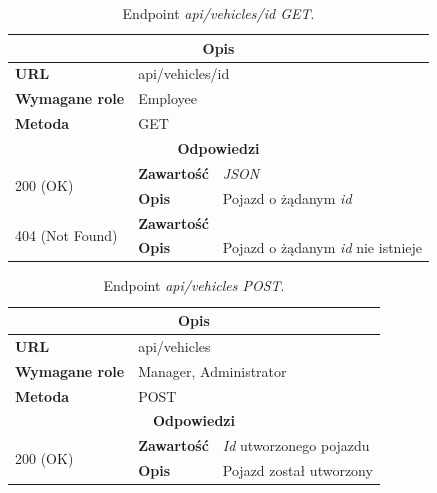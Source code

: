 \documentclass[eng,printmode,openany]{mgr}
\begin{document}
\begin{table}[H]
	\caption{Endpoint \textit{api/vehicles/id GET}.}
	\begin{tabularx}{\textwidth}{|l|l|X|}
		\hline
		\multicolumn{3}{|c|}{\textbf{\textbf{Opis}}}
		\\ \hline
		\textbf{URL}                         & \multicolumn{2}{l|}{api/vehicles/id}
		\\ \hline
		\textbf{Wymagane role}               & \multicolumn{2}{l|}{Employee}
		\\ \hline
		\textbf{Metoda}                      & \multicolumn{2}{l|}{GET}
		\\ \hline
		\multicolumn{3}{|c|}{\textbf{Odpowiedzi}}
		\\ \hline
		\multirow{2}{*}{200 (OK)} 	        & \textbf{Zawartość}   	& \textit{JSON}
		\\ \cline{2-3}                      & \textbf{Opis}         	& Pojazd o żądanym \textit{id}
		\\ \hline
		\multirow{2}{*}{404 (Not Found)} 	& \textbf{Zawartość}     & 
		\\ \cline{2-3}                      & \textbf{Opis}          & Pojazd o żądanym \textit{id} nie istnieje
		\\ \hline
	\end{tabularx}
\end{table}

\begin{table}[H]
	\caption{Endpoint \textit{api/vehicles POST}.}
	\begin{tabularx}{\textwidth}{|l|l|X|}
		\hline
		\multicolumn{3}{|c|}{\textbf{\textbf{Opis}}}
		\\ \hline
		\textbf{URL}                       & \multicolumn{2}{l|}{api/vehicles}
		\\ \hline
		\textbf{Wymagane role}             & \multicolumn{2}{l|}{Manager, Administrator}
		\\ \hline
		\textbf{Metoda}                    & \multicolumn{2}{l|}{POST}
		\\ \hline
		\multicolumn{3}{|c|}{\textbf{Odpowiedzi}}
		\\ \hline
		\multirow{2}{*}{200 (OK)} 		& \textbf{Zawartość}     & \textit{Id} utworzonego pojazdu
		\\ \cline{2-3}                  & \textbf{Opis}         	& Pojazd został utworzony
		\\ \hline
	\end{tabularx}
\end{table}
\end{document}
